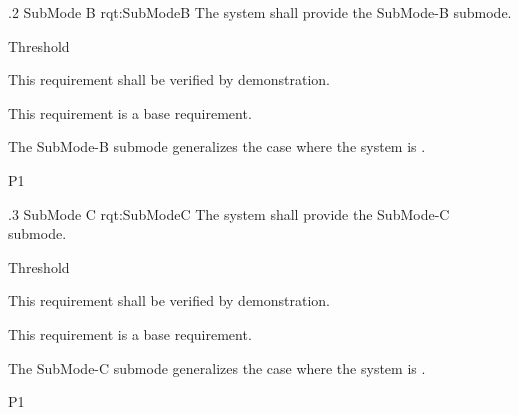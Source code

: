 \ONERQMTV
{\RqtNumberBase.2}
{SubMode B}
{rqt:SubModeB}
{The system shall provide the SubMode-B submode.}
{
	\item [Phase 1] Threshold
}
{This requirement shall be verified by demonstration.}
{
	\item [N/A] This requirement is a base requirement.
}
{
	\item The SubMode-B submode generalizes the case where the system is \TBD.
}
{P1}


\ONERQMTV
{\RqtNumberBase.3}
{SubMode C}
{rqt:SubModeC}
{The system shall provide the SubMode-C submode.}
{
	\item [Phase 1] Threshold
}
{This requirement shall be verified by demonstration.}
{
	\item [N/A] This requirement is a base requirement.
}
{
	\item The SubMode-C submode generalizes the case where the system is \TBD.
}
{P1}


